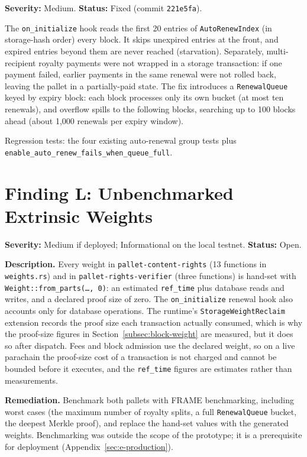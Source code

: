 \textbf{Severity:} Medium. \textbf{Status:} Fixed (commit \texttt{221e5fa}).

The \texttt{on\_initialize} hook reads the first 20 entries of \texttt{AutoRenewIndex} (in storage-hash order) every block. It skips unexpired entries at the front, and expired entries beyond them are never reached (starvation). Separately, multi-recipient royalty payments were not wrapped in a storage transaction: if one payment failed, earlier payments in the same renewal were not rolled back, leaving the pallet in a partially-paid state. The fix introduces a \texttt{RenewalQueue} keyed by expiry block: each block processes only its own bucket (at most ten renewals), and overflow spills to the following blocks, searching up to 100 blocks ahead (about 1,000 renewals per expiry window).

Regression tests: the four existing auto-renewal group tests plus\\
\texttt{enable\_auto\_renew\_fails\_when\_queue\_full}.

\section[Finding L: Unbenchmarked Weights]{Finding L: Unbenchmarked Extrinsic Weights}\label{sec:d-finding-l}

\textbf{Severity:} Medium if deployed; Informational on the local testnet. \textbf{Status:} Open.

\textbf{Description.} Every weight in \texttt{pallet-content-rights} (13 functions in \texttt{weights.rs}) and in \texttt{pallet-rights-verifier} (three functions) is hand-set with \texttt{Weight::from\_parts(\ldots, 0)}: an estimated \texttt{ref\_time} plus database reads and writes, and a declared proof size of zero. The \texttt{on\_initialize} renewal hook also accounts only for database operations. The runtime's \texttt{StorageWeightReclaim} extension records the proof size each transaction actually consumed, which is why the proof-size figures in Section~\ref{subsec:block-weight} are measured, but it does so after dispatch. Fees and block admission use the declared weight, so on a live parachain the proof-size cost of a transaction is not charged and cannot be bounded before it executes, and the \texttt{ref\_time} figures are estimates rather than measurements.

\textbf{Remediation.} Benchmark both pallets with FRAME benchmarking, including worst cases (the maximum number of royalty splits, a full \texttt{RenewalQueue} bucket, the deepest Merkle proof), and replace the hand-set values with the generated weights. Benchmarking was outside the scope of the prototype; it is a prerequisite for deployment (Appendix~\ref{sec:e-production}).

